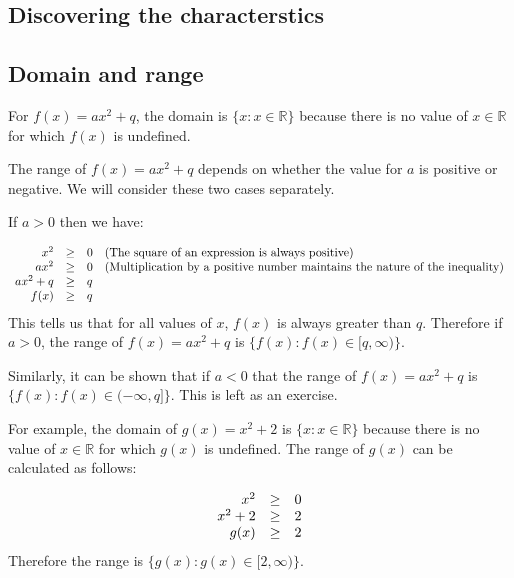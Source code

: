 \subsection*{Discovering the characterstics}

\subsection*{Domain and range}

For $f(x)=a{x}^{2}+q$, the domain is $\{x:x\in \mathbb{R}\}$ because there is no value of $x\in \mathbb{R}$ for which $f(x)$ is undefined.\par 
The range of $f(x)=a{x}^{2}+q$ depends on whether the value for $a$ is positive or negative. We will consider these two cases separately.\par 
If $a>0$ then we have:\par 

\begin{equation*}
\begin{array}{cccc}\hfill {x}^{2}& \ge & 0\hfill & (\mbox{The square of an expression is always positive})\hfill \\
 \hfill a{x}^{2}& \ge & 0\hfill & (\mbox{Multiplication by a positive number maintains the nature of the inequality})\hfill \\
 \hfill a{x}^{2}+q& \ge & q\hfill & \\ \hfill f(x)& \ge & q\hfill & 
\end{array}
\end{equation*}
This tells us that for all values of $x$, $f(x)$ is always greater than $q$. Therefore if $a>0$, the range of $f(x)=a{x}^{2}+q$ is $\{f(x):f(x)\in [q,\infty )\}$.\par 
Similarly, it can be shown that if $a<0$ that the range of $f(x)=a{x}^{2}+q$ is $\{f(x):f(x)\in (-\infty ,q]\}$. This is left as an exercise.\par 
For example, the domain of $g(x)={x}^{2}+2$ is $\{x:x\in \mathbb{R}\}$ because there is no value of $x\in \mathbb{R}$ for which $g(x)$ is undefined. The range of $g(x)$ can be calculated as follows:\par 

\begin{equation*}
\begin{array}{ccc}\hfill {x}^{2}& \ge & 0\hfill \\
 \hfill {x}^{2}+2& \ge & 2\hfill \\
 \hfill g(x)& \ge & 2\hfill 
\end{array}
\end{equation*}
Therefore the range is $\{g(x):g(x)\in [2,\infty )\}$.\par 


